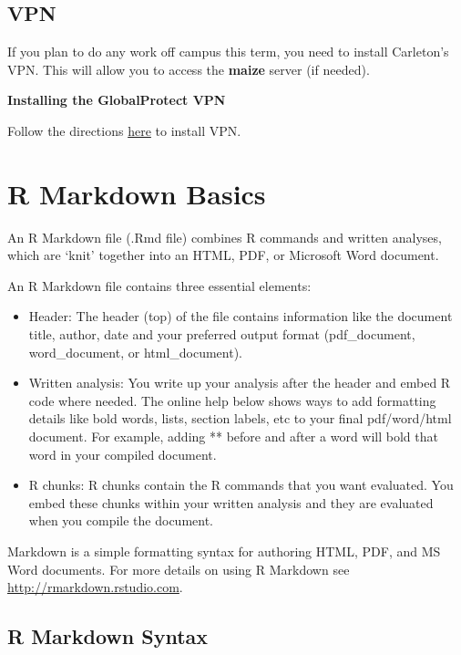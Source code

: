\documentclass[
]{book}
\begin{document}
\hypertarget{vpn}{%
\section{VPN}\label{vpn}}

If you plan to do any work off campus this term, you need to install Carleton's VPN. This will allow you to access the \textbf{maize} server (if needed).

\textbf{Installing the GlobalProtect VPN}

Follow the directions \href{https://wiki.carleton.edu/display/itskb/GlobalProtect+VPN}{here} to install VPN.

\hypertarget{r-markdown-basics}{%
\chapter{R Markdown Basics}\label{r-markdown-basics}}

An R Markdown file (.Rmd file) combines R commands and written analyses, which are `knit' together into an HTML, PDF, or Microsoft Word document.

An R Markdown file contains three essential elements:

\begin{itemize}
\item
  Header: The header (top) of the file contains information like the document title, author, date and your preferred output format (pdf\_document, word\_document, or html\_document).
\item
  Written analysis: You write up your analysis after the header and embed R code where needed. The online help below shows ways to add formatting details like bold words, lists, section labels, etc to your final pdf/word/html document. For example, adding ** before and after a word will bold that word in your compiled document.
\item
  R chunks: R chunks contain the R commands that you want evaluated. You embed these chunks within your written analysis and they are evaluated when you compile the document.
\end{itemize}

Markdown is a simple formatting syntax for authoring HTML, PDF, and MS Word documents. For more details on using R Markdown see \url{http://rmarkdown.rstudio.com}.

\hypertarget{r-markdown-syntax}{%
\section{R Markdown Syntax}\label{r-markdown-syntax}}
\end{document}
